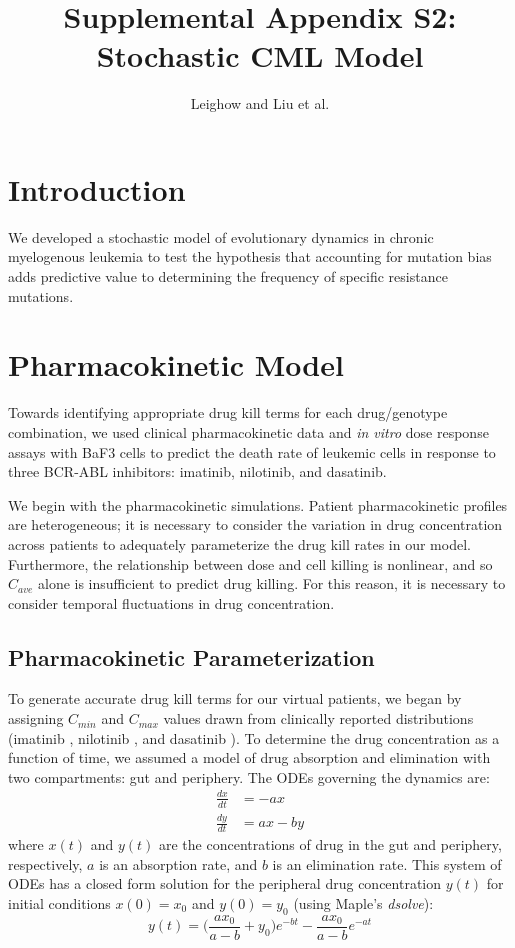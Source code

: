 \documentclass{article}
\title{Supplemental Appendix S2: \\
\large Stochastic CML Model}
\author{Leighow and Liu et al.}
\begin{document}
\maketitle

\section{Introduction}

We developed a stochastic model of evolutionary dynamics in chronic myelogenous leukemia to test the hypothesis that accounting for mutation bias adds predictive value to determining the frequency of specific resistance mutations.

\section{Pharmacokinetic Model}

Towards identifying appropriate drug kill terms for each drug/genotype combination, we used clinical pharmacokinetic data and \textit{in vitro} dose response assays with BaF3 cells to predict the death rate of leukemic cells in response to three BCR-ABL inhibitors: imatinib, nilotinib, and dasatinib.  

We begin with the pharmacokinetic simulations.  Patient pharmacokinetic profiles are heterogeneous; it is necessary to consider the variation in drug concentration across patients to adequately parameterize the drug kill rates in our model.  Furthermore, the relationship between dose and cell killing is nonlinear, and so $C_{ave}$ alone is insufficient to predict drug killing.  For this reason, it is necessary to consider temporal fluctuations in drug concentration.
\subsection{Pharmacokinetic Parameterization}
To generate accurate drug kill terms for our virtual patients, we began by assigning $C_{min}$ and $C_{max}$ values drawn from clinically reported distributions (imatinib \cite{1}, nilotinib \cite{2}, and dasatinib \cite{3}).  To determine the drug concentration as a function of time, we assumed a model of drug absorption and elimination with two compartments: gut and periphery.  The ODEs governing the dynamics are:
\begin{equation}
\begin{split}
\frac{dx}{dt} &= -a x \\
\frac{dy}{dt} &= a x - b y
\end{split}
\end{equation}
where $x(t)$ and $y(t)$ are the concentrations of drug in the gut and periphery, respectively, $a$ is an absorption rate, and $b$ is an elimination rate.  This system of ODEs has a closed form solution for the peripheral drug concentration $y(t)$ for initial conditions $x(0) = x_0$ and $y(0) = y_0$ (using Maple's \textit{dsolve}):
\begin{equation}
y(t) = \Big(\frac{a x_0}{a-b} + y_0\Big) e^{-b t} - \frac{a x_0}{a - b} e^{-a t}
\end{equation}
\end{document}
